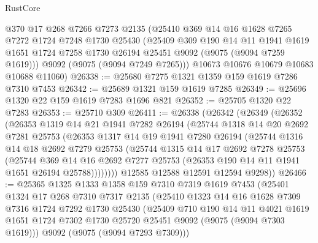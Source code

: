 \begin{lexlean}{RustCore}
\begin{coremodule}
      @370
      @17
      @268
      @7266
      @7273
      @2135
      (@25410
        @369
        @14
        @16
        @1628
        @7265
        @7272
        @1724
        @7248
        @1730
        @25430
        (@25409
          @309
          @190
          @14
          @11
          @1941
          @1619
          @1651
          @1724
          @7258
          @1730
          @26194
          @25451
          @9092
          (@9075 (@9094 @7259 @1619)))
        @9092
        (@9075 (@9094 @7249 @7265)))
      @10673
      @10676
      @10679
      @10683
      @10688
      @11060)
@26338 := @25680 @7275 @1321 @1359 @159 @1619 @7286 @7310 @7453
@26342 := @25689 @1321 @159 @1619 @7285
@26349 := @25696 @1320 @22 @159 @1619 @7283 @1696 @821
@26352 := @25705 @1320 @22 @7283
@26353 := @25710 @309
@26411 := @26338
    (@26342
      (@26349
        (@26352
          (@26353
            @1319
            @14
            @21
            @1941
            @7282
            @26194
            (@25744
              @1318
              @14
              @20
              @2692
              @7281
              @25753
              (@26353
                @1317
                @14
                @19
                @1941
                @7280
                @26194
                (@25744
                  @1316
                  @14
                  @18
                  @2692
                  @7279
                  @25753
                  (@25744
                    @1315
                    @14
                    @17
                    @2692
                    @7278
                    @25753
                    (@25744
                      @369
                      @14
                      @16
                      @2692
                      @7277
                      @25753
                      (@26353 @190 @14 @11 @1941 @1651 @26194 @25788))))))))
        @12585
        @12588
        @12591
        @12594
        @9298))
@26466 := @25365
    @1325
    @1333
    @1358
    @159
    @7310
    @7319
    @1619
    @7453
    (@25401
      @1324
      @17
      @268
      @7310
      @7317
      @2135
      (@25410
        @1323
        @14
        @16
        @1628
        @7309
        @7316
        @1724
        @7292
        @1730
        @25430
        (@25409
          @710
          @190
          @14
          @11
          @4021
          @1619
          @1651
          @1724
          @7302
          @1730
          @25720
          @25451
          @9092
          (@9075 (@9094 @7303 @1619)))
        @9092
        (@9075 (@9094 @7293 @7309)))

\end{coremodule}
\end{lexlean}
